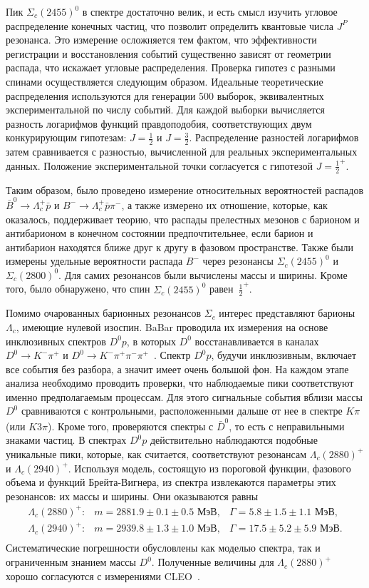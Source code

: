 \documentclass[a4paper, 12pt]{article}
\def\LcIII{\Lambda_c(2880)^+}
\def\LcIV{\Lambda_c(2940)^+}
\def\Km{K^-}
\def\pip{\pi^+}
\def\pim{\pi^-}
\begin{document}
Пик $\Sigma_c(2455)^0$ в спектре достаточно велик, и есть смысл изучить 
угловое распределение конечных частиц, что позволит определить квантовые 
числа $J^P$ резонанса. Это измерение осложняется тем фактом, что 
эффективности регистрации и восстановления событий существенно зависят 
от геометрии распада, что искажает угловые распределения. Проверка 
гипотез с разными спинами осуществляется следующим образом. Идеальные 
теоретические распределения используются для генерации 500 выборок, 
эквивалентных экспериментальной по числу событий. Для каждой выборки 
вычисляется разность логарифмов функций правдоподобия, соответствующих 
двум конкурирующим гипотезам: $J=\frac{1}{2}$ и $J=\frac{3}{2}$. 
Распределение разностей логарифмов затем сравнивается с разностью, 
вычисленной для реальных экспериментальных данных. Положение 
экспериментальной точки согласуется с гипотезой $J=\frac{1}{2}^+$.

Таким образом, было проведено измерение относительных вероятностей 
распадов $\bar{B}^0\to\Lambda_c^+\bar{p}$ 
и $B^-\to\Lambda_c^+\bar{p}\pi^-$, а также измерено их отношение, 
которые, как оказалось, поддерживает теорию, что распады прелестных 
мезонов с барионом и антибарионом в конечном состоянии предпочтительнее, 
если барион и антибарион находятся ближе друг к другу в фазовом 
пространстве.
%
Также были измерены удельные вероятности распада $B^-$ через резонансы 
$\Sigma_c(2455)^0$ и $\Sigma_c(2800)^0$. Для самих резонансов были 
вычислены массы и ширины.
%
Кроме того, было обнаружено, что спин $\Sigma_c(2455)^0$ 
равен~$\frac{1}{2}^+$.

Помимо очарованных барионных резонансов $\Sigma_c$ интерес представляют 
барионы $\Lambda_c$, имеющие нулевой изоспин. BaBar проводила их 
измерения на основе инклюзивных спектров $D^0p$, в которых $D^0$ 
восстанавливается в каналах $D^0\to\Km\pip$ 
и $D^0\to\Km\pip\pim\pip$~\cite{4-babar-lc}.
%
Спектр $D^0p$, будучи инклюзивным, включает все события без разбора, 
а значит имеет очень большой фон. На каждом этапе анализа необходимо 
проводить проверки, что наблюдаемые пики соответствуют именно 
предполагаемым процессам. Для этого сигнальные события вблизи массы 
$D^0$ сравниваются с контрольными, расположенными дальше от нее 
в спектре $K\pi$ (или $K3\pi$). Кроме того, проверяются спектры 
с $\bar{D}^0$, то есть с неправильными знаками частиц.
%
В спектрах $D^0p$ действительно наблюдаются подобные уникальные пики, 
которые, как считается, соответствуют резонансам $\LcIII$ и $\LcIV$.
%
Используя модель, состоящую из пороговой функции, фазового объема 
и функций Брейта-Вигнера, из спектра извлекаются параметры этих 
резонансов: их массы и ширины. Они оказываются равны
\[
  \begin{array}{lll}
    \LcIII: &
    m = 2881.9 \pm 0.1 \pm 0.5 \text{ МэВ}, &
    \Gamma = 5.8 \pm 1.5 \pm 1.1 \text{ МэВ}, \\
    \LcIV: &
    m = 2939.8 \pm 1.3 \pm 1.0 \text{ МэВ}, &
    \Gamma = 17.5 \pm 5.2 \pm 5.9 \text{ МэВ}. \\
  \end{array}
\]
Систематические погрешности обусловлены как моделью спектра, так 
и ограниченным знанием массы $D^0$. Полученные величины для $\LcIII$ 
хорошо согласуются с измерениями CLEO~\cite{4-cleo-lc}.
\end{document}
